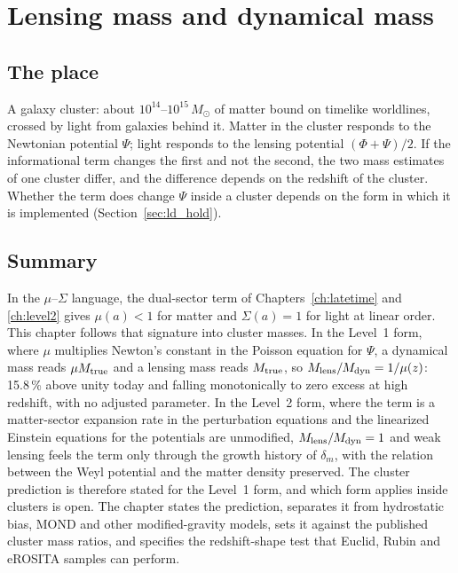 \chapter{Lensing mass and dynamical mass}\label{ch:lensdyn}

\section*{The place}
A galaxy cluster: about $10^{14}$--$10^{15}\,M_\odot$ of matter bound on timelike worldlines, crossed by light from galaxies behind it. Matter in the
cluster responds to the Newtonian potential $\Psi$; light responds to the lensing potential $(\Phi+\Psi)/2$. If the informational term changes the first
and not the second, the two mass estimates of one cluster differ, and the difference depends on the redshift of the cluster. Whether the term does
change $\Psi$ inside a cluster depends on the form in which it is implemented (Section~\ref{sec:ld_hold}).

\section*{Summary}
In the $\mu$--$\Sigma$ language, the dual-sector term of Chapters~\ref{ch:latetime} and \ref{ch:level2} gives $\mu(a)<1$ for matter and $\Sigma(a)=1$
for light at linear order. This chapter follows that signature into cluster masses. In the Level~1 form, where $\mu$ multiplies Newton's constant in
the Poisson equation for $\Psi$, a dynamical mass reads $\mu M_{\rm true}$ and a lensing mass reads $M_{\rm true}$, so
$M_{\rm lens}/M_{\rm dyn}=1/\mu(z)$: 15.8\,\% above unity today and falling monotonically to zero excess at high redshift, with no adjusted
parameter. In the Level~2 form, where the term is a matter-sector expansion rate in the perturbation equations and the linearized Einstein equations
for the potentials are unmodified, $M_{\rm lens}/M_{\rm dyn}=1$ and weak lensing feels the term only through the growth history of $\delta_m$, with
the relation between the Weyl potential and the matter density preserved. The cluster prediction is therefore stated for the Level~1 form, and which
form applies inside clusters is open. The chapter states the prediction, separates it from hydrostatic bias, MOND and other modified-gravity models,
sets it against the published cluster mass ratios, and specifies the redshift-shape test that Euclid, Rubin and eROSITA samples can perform.

